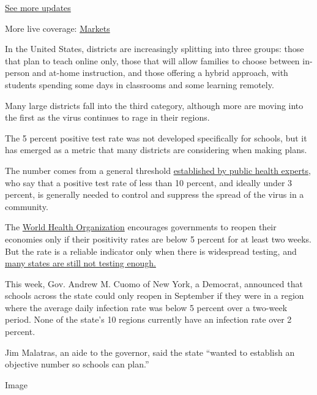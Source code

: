 \href{https://www.nytimes.com/2020/08/01/world/coronavirus-covid-19.html?action=click\&pgtype=Article\&state=default\&region=MAIN_CONTENT_1\&context=storylines_live_updates}{See
more updates}

More live coverage:
\href{https://www.nytimes.com/live/2020/07/31/business/stock-market-today-coronavirus?action=click\&pgtype=Article\&state=default\&region=MAIN_CONTENT_1\&context=storylines_live_updates}{Markets}

In the United States, districts are increasingly splitting into three
groups: those that plan to teach online only, those that will allow
families to choose between in-person and at-home instruction, and those
offering a hybrid approach, with students spending some days in
classrooms and some learning remotely.

Many large districts fall into the third category, although more are
moving into the first as the virus continues to rage in their regions.

The 5 percent positive test rate was not developed specifically for
schools, but it has emerged as a metric that many districts are
considering when making plans.

The number comes from a general threshold
\href{https://globalepidemics.org/wp-content/uploads/2020/06/key_metrics_and_indicators_v4.pdf}{established
by public health experts}, who say that a positive test rate of less
than 10 percent, and ideally under 3 percent, is generally needed to
control and suppress the spread of the virus in a community.

The \href{https://coronavirus.jhu.edu/testing/testing-positivity}{World
Health Organization} encourages governments to reopen their economies
only if their positivity rates are below 5 percent for at least two
weeks. But the rate is a reliable indicator only when there is
widespread testing, and
\href{https://www.nytimes.com/interactive/2020/us/coronavirus-testing.html}{many
states are still not testing enough.}

This week, Gov. Andrew M. Cuomo of New York, a Democrat, announced that
schools across the state could only reopen in September if they were in
a region where the average daily infection rate was below 5 percent over
a two-week period. None of the state's 10 regions currently have an
infection rate over 2 percent.

Jim Malatras, an aide to the governor, said the state ``wanted to
establish an objective number so schools can plan.''

Image

